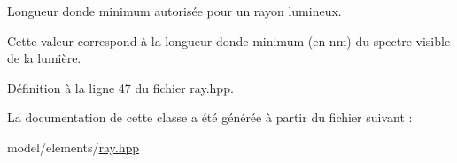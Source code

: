 Longueur d\textquotesingle{}onde minimum autorisée pour un rayon lumineux. 

Cette valeur correspond à la longueur d\textquotesingle{}onde minimum (en nm) du spectre visible de la lumière. 

Définition à la ligne 47 du fichier ray.\+hpp.



La documentation de cette classe a été générée à partir du fichier suivant \+:\begin{DoxyCompactItemize}
\item 
model/elements/\hyperlink{ray_8hpp}{ray.\+hpp}\end{DoxyCompactItemize}
